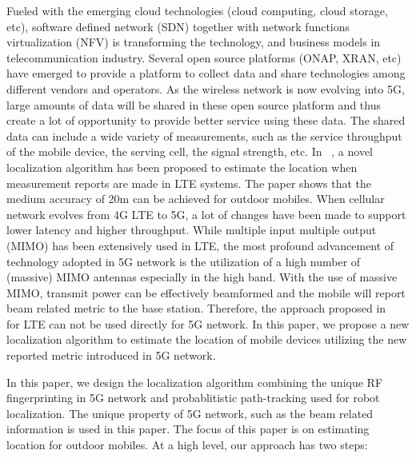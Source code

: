 \documentclass[conference, 10pt]{IEEEtran}
\begin{document}
Fueled with the emerging cloud technologies (cloud computing, cloud storage, etc), software defined network (SDN) together with 
network functions virtualization (NFV) is transforming the technology, and business models in telecommunication industry.
Several open source platforms (ONAP, XRAN, etc) have emerged to provide a platform to collect data and share technologies among different 
vendors and operators. As the wireless network is now evolving into 5G, large amounts of data will be shared in these open source platform and thus create 
a lot of opportunity to provide better service using these data. The shared data can include a wide variety of measurements, such as the service throughput of the mobile 
device, the serving cell, the signal strength, etc. In ~\cite{Pantelis2016Localization}, a novel localization algorithm has been proposed to estimate 
the location when measurement reports are made in LTE systems. The paper shows that the medium accuracy of 20m can be achieved for outdoor mobiles. 
When cellular network evolves from 4G LTE to 5G, a lot of changes have been made to support lower latency and higher throughput. While multiple input multiple output (MIMO) has been extensively used in LTE, the most profound advancement of technology adopted in 5G
network is the utilization of a high number of (massive) MIMO antennas especially in the high band. With the use of massive MIMO, transmit power can be effectively beamformed and the mobile will report beam related metric to the base station. 
Therefore, the approach proposed in ~\cite{Pantelis2016Localization} for LTE can not be used directly for 5G network. In this paper, we propose a new localization algorithm to estimate the location of mobile devices utilizing the new reported metric introduced in 5G network.
 

In this paper, we design the localization algorithm combining the unique RF 
fingerprinting in 5G network and probablitistic path-tracking used for robot localization. The unique property of 5G network, such as the beam related 
information is used in this paper. The focus of this paper is on estimating location for outdoor mobiles. 
At a high level, our approach has two steps:
\end{document}

